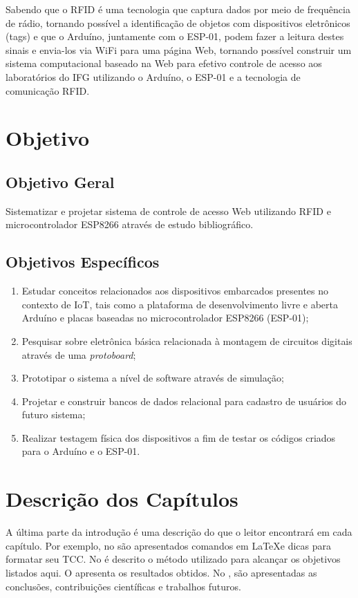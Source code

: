 Sabendo que o RFID é uma tecnologia que captura dados por meio de frequência de rádio, tornando possível a identificação de objetos com dispositivos eletrônicos (tags) e que o Arduíno, juntamente com o ESP-01, podem fazer a leitura destes sinais e envia-los via \acf{WiFi} para uma página Web, tornando possível construir um sistema computacional baseado na Web para efetivo controle de acesso aos laboratórios do IFG utilizando o Arduíno, o ESP-01 e a tecnologia de comunicação RFID.

\section*{Objetivo}

\subsection{Objetivo Geral}

Sistematizar e projetar sistema de controle de acesso Web utilizando RFID e microcontrolador ESP8266 através de estudo bibliográfico.

\subsection{Objetivos Específicos}

\begin{enumerate}
    \item Estudar conceitos relacionados aos dispositivos embarcados presentes no contexto de IoT, tais como a plataforma de desenvolvimento livre e aberta Arduíno e placas baseadas no microcontrolador ESP8266 (ESP-01);
	
	\item Pesquisar sobre eletrônica básica relacionada à montagem de circuitos digitais através de uma \textit{protoboard};

	\item Prototipar o sistema a nível de software através de simulação;

	\item Projetar e construir bancos de dados relacional para cadastro de usuários do futuro sistema;  
	
	\item Realizar testagem física dos dispositivos a fim de testar os códigos criados para o Arduíno e o ESP-01.

\end{enumerate}



\section{Descrição dos Capítulos}

A última parte da introdução é uma descrição do que o leitor encontrará em cada capítulo.
Por exemplo, no  são apresentados comandos em \LaTeX e dicas para formatar seu TCC.
No  é descrito o método utilizado para alcançar os objetivos listados aqui.
O  apresenta os resultados obtidos.
No , são apresentadas as conclusões, contribuições científicas e trabalhos futuros.




